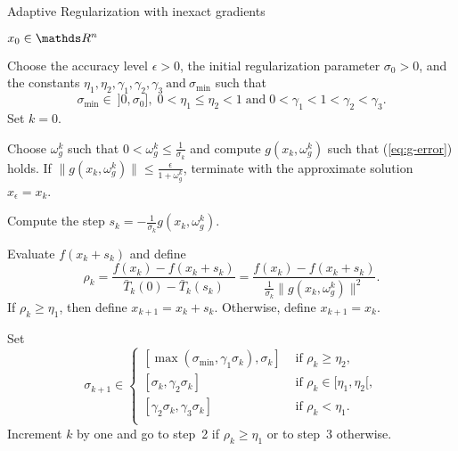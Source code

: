 \documentclass[runningheads,orivec,oribibl]{llncs}
\begin{document}
\begin{algorithm}[H]
  \caption{Adaptive Regularization with inexact gradients}
  \label{alg:regularization-inexact}
  \begin{algorithmic}[1]
    \Require \(x_0 \in \R^n\)

    \State Choose the accuracy level \(\epsilon > 0\), the initial regularization parameter \(\sigma_0 > 0\), and the constants \(\eta_1, \eta_2, \gamma_1, \gamma_2, \gamma_3 \ \text{and} \ \sigma_{\min}\) such that
    \begin{equation}
      \label{ar:parameters}
      \sigma_{\min} \in~]0,\sigma_0], \;
      0<\eta_1 \leq \eta_2<1 \; \text{and} \;
      0<\gamma_1<1<\gamma_2<\gamma_3.
    \end{equation}
    Set \(k = 0\).

    \State Choose \(\omega_g^k\) such that \(0 < \omega_g^k \leq \tfrac{1}{\sigma_k}\) and compute \(g(x_k,\omega_g^k)\) such that (\ref{eq:g-error}) holds.
    If \(\|g(x_k,\omega_g^k)\|\leq \frac{\epsilon}{1+\omega_g^k}\), terminate with the approximate solution \(x_{\epsilon} = x_k\).

    \State Compute the step \(s_k = -\frac{1}{\sigma_k}g(x_k,\omega_g^k)\).

    \State Evaluate $f(x_k+s_k)$ and define
    \begin{equation}
      \label{ar:ratio}
      \rho_k = \frac{f(x_k)-f(x_k+s_k)}{\bar{T}_k(0)-\bar{T}_k(s_k)} = \frac{f(x_k)-f(x_k+s_k)}{\frac{1}{\sigma_k}\|g(x_k,\omega_g^k)\|^2}.
    \end{equation}
    If \(\rho_k \geq \eta_1\), then define \(x_{k+1} = x_k + s_k\).
    Otherwise, define \(x_{k+1} = x_k\).

    \State Set
    \begin{equation}
      \label{ar:update}
      \sigma_{k+1} \in
      \begin{cases}
        [\max(\sigma_{\min}, \gamma_1\sigma_k), \sigma_k]
        &\text{ if } \rho_k \geq \eta_2, \\
        [\sigma_k, \gamma_2\sigma_k]
        &\text{ if } \rho_k \in [\eta_1, \eta_2[, \\
        [\gamma_2\sigma_k, \gamma_3\sigma_k]
        &\text{ if } \rho_k < \eta_1. \\
      \end{cases}
    \end{equation}
    Increment \(k\) by one and go to step~2 if \(\rho_k \geq \eta_1\) or to step~3 otherwise.
  \end{algorithmic}
\end{algorithm}
\end{document}
